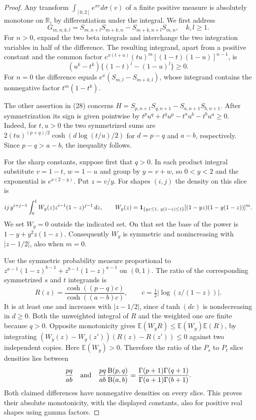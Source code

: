 \documentclass[11pt,a4paper]{article}
\numberwithin{equation}{section}
\begin{document}
\begin{proof}
Any transform $\int_{[0,2]} e^{xv}d\sigma(v)$ of a finite positive
measure is absolutely monotone on $\mathbb R$, by differentiation
under the integral. We first address
\[
 G_{m,n;k,l}=S_{m,n+l}S_{m+k,n}-S_{m+k,n+l}S_{m,n},
 \quad k,l\ge1 .
\]
For $n>0$, expand the two beta integrals and interchange the
two integration variables in half of the difference. The resulting
integrand, apart from a positive constant and the common factor
$e^{x(t+u)}(tu)^m[(1-t)(1-u)]^{n-1}$, is
\[
  (u^k-t^k)\{(1-t)^l-(1-u)^l\}\ge0 .
\]
For $n=0$ the difference equals $e^x(S_{m,l}-S_{m+k,l})$, whose
integrand contains the nonnegative factor $t^m(1-t^k)$.

The other assertion in (28) concerns
$H=S_{p,n+1}S_{q,n+1}-S_{a,n+1}S_{b,n+1}$.
After symmetrization its sign is given pointwise by
$t^pu^q+t^qu^p-t^au^b-t^bu^a\ge0$.
Indeed, for $t,u>0$ the two symmetrized sums are
$2(tu)^{(p+q)/2}\cosh(d\log(t/u)/2)$ for $d=p-q$ and $a-b$,
respectively. Since $p-q>a-b$, the inequality follows.

For the sharp constants, suppose first that $q>0$. In each product
integral substitute $v=1-t$, $w=1-u$ and group by $y=v+w$,
so $0<y<2$ and the exponential is $e^{x(2-y)}$. Put $z=v/y$.
For shapes $(i,j)$ the density on this slice is
\[
 ij\,y^{i+j-1}\int_0^1 W_y(z) z^{i-1}(1-z)^{j-1}\,dz ,
 \qquad
 W_y(z)={\bf1}_{\{yz\le1,\ y(1-z)\le1\}}
          [(1-yz)(1-y(1-z))]^m .
\]
We set $W_y=0$ outside the indicated set. On that set the base of
the power is $1-y+y^2z(1-z)$. Consequently $W_y$ is symmetric
and nonincreasing with $|z-1/2|$, also when $m=0$.

Use the symmetric probability measure proportional to
$z^{a-1}(1-z)^{b-1}+z^{b-1}(1-z)^{a-1}$ on $(0,1)$.
The ratio of the corresponding symmetrized $s$ and $t$ integrands is
\[
 R(z)=\frac{\cosh((p-q)c)}{\cosh((a-b)c)},\qquad
 c=\tfrac12|\log(z/(1-z))|.
\]
It is at least one and increases with $|z-1/2|$, since
$d\tanh(dc)$ is nondecreasing in $d\ge0$. Both the unweighted
integral of $R$ and the weighted one are finite because $q>0$.
Opposite monotonicity gives
$\mathbb E(W_y R)\le \mathbb E(W_y)\mathbb E(R)$, by integrating
$(W_y(z)-W_y(z'))(R(z)-R(z'))\le0$ against two independent copies.
Here $\mathbb E(W_y)>0$. Therefore the ratio of the $P_s$ to $P_t$
slice densities lies between
\[
 \frac{pq}{ab}
 \quad\hbox{and}\quad
 \frac{pq}{ab}\frac{\mathrm B(p,q)}{\mathrm B(a,b)}
 =\frac{\Gamma(p+1)\Gamma(q+1)}{\Gamma(a+1)\Gamma(b+1)} .
\]
Both claimed differences have nonnegative densities on every slice.
This proves their absolute monotonicity, with the displayed constants,
also for positive real shapes using gamma factors.


\end{proof}
\end{document}
